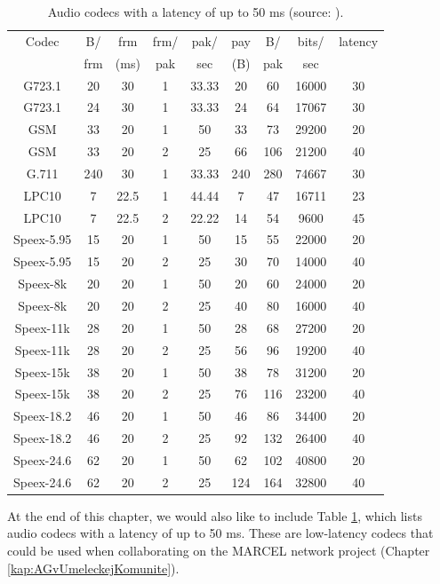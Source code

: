 \begin{table}
\centering
\begin{tabular}[t]{|c|c|c|c|c|c|c|c|c|}
\hline
Codec  & B/ & frm & frm/ & pak/ & pay  & B/ & bits/ & latency \\
 & frm & (ms) & pak & sec & (B) & pak & sec & \\
\hline
G723.1 & 20 & 30 & 1 & 33.33 & 20 & 60 & 16000 & 30 \\
G723.1 & 24 & 30 & 1 & 33.33 & 24 & 64 & 17067 & 30 \\
GSM & 33 & 20 & 1 & 50 & 33  & 73 & 29200 & 20 \\
GSM & 33 & 20 & 2 & 25 & 66  & 106 & 21200 & 40 \\
G.711 & 240 & 30 & 1 & 33.33 & 240 & 280 & 74667  & 30 \\
LPC10 & 7 & 22.5 & 1 & 44.44 & 7  & 47 & 16711 & 23 \\
LPC10 & 7 & 22.5 & 2 & 22.22 & 14 & 54 & 9600 & 45 \\
Speex-5.95 & 15 & 20 & 1 & 50 & 15 &  55 & 22000 &  20 \\
Speex-5.95 & 15 & 20 & 2 & 25 & 30 &  70 & 14000 &  40 \\
Speex-8k & 20 & 20 & 1 & 50 & 20  & 60 & 24000  & 20 \\
Speex-8k & 20 & 20 & 2 & 25 & 40  & 80 & 16000 &  40 \\
Speex-11k & 28 & 20 & 1 & 50 & 28 & 68 & 27200 &  20 \\
Speex-11k & 28 & 20 & 2 & 25 & 56 & 96 & 19200 &  40 \\
Speex-15k & 38 & 20 & 1 & 50 & 38 & 78 & 31200 &  20 \\
Speex-15k & 38 & 20 & 2 & 25 & 76 & 116 & 23200 &  40 \\
Speex-18.2 & 46 & 20 & 1 & 50 & 46 & 86 & 34400 &  20 \\
Speex-18.2 & 46 & 20 & 2 & 25 & 92 & 132 & 26400 &  40 \\
Speex-24.6 & 62 & 20 & 1 & 50 & 62 & 102 & 40800 &  20 \\
Speex-24.6 & 62 & 20 & 2 & 25 & 124 & 164 & 32800 &  40 \\
\hline
\end{tabular}
\caption{Audio codecs with a latency of up to 50 ms (source: \protect\cite{Latency-AudioCodecs}).}
\label{tab:AudioCodecsMinLatency}
\end{table}

At the end of this chapter, we would also like to include Table \ref{tab:AudioCodecsMinLatency}, which lists audio codecs with a latency of up to 50 ms. These are low-latency codecs that could be used when collaborating on the MARCEL network project (Chapter \ref{kap:AGvUmeleckejKomunite}).
\proofed

